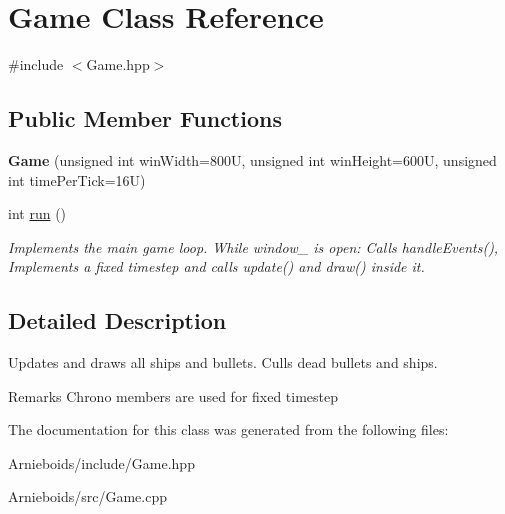 \hypertarget{class_game}{}\section{Game Class Reference}
\label{class_game}


{\ttfamily \#include $<$Game.\+hpp$>$}

\subsection*{Public Member Functions}
\begin{DoxyCompactItemize}
\item 
\hypertarget{class_game_a50d0ebb6c8c0dbb762d2c1c10bc0c91c}{}{\bfseries Game} (unsigned int win\+Width=800\+U, unsigned int win\+Height=600\+U, unsigned int time\+Per\+Tick=16\+U)\label{class_game_a50d0ebb6c8c0dbb762d2c1c10bc0c91c}

\item 
\hypertarget{class_game_a99fb161fbbe87d25a8b73265a0611e58}{}int \hyperlink{class_game_a99fb161fbbe87d25a8b73265a0611e58}{run} ()\label{class_game_a99fb161fbbe87d25a8b73265a0611e58}

\begin{DoxyCompactList}\small\item\em Implements the main game loop. While window\+\_\+ is open\+: Calls handle\+Events(), Implements a fixed timestep and calls update() and draw() inside it. \end{DoxyCompactList}\end{DoxyCompactItemize}


\subsection{Detailed Description}
Updates and draws all ships and bullets. Culls dead bullets and ships.

\begin{DoxyRemark}{Remarks}
Chrono members are used for fixed timestep 
\end{DoxyRemark}


The documentation for this class was generated from the following files\+:\begin{DoxyCompactItemize}
\item 
Arnieboids/include/Game.\+hpp\item 
Arnieboids/src/Game.\+cpp\end{DoxyCompactItemize}
